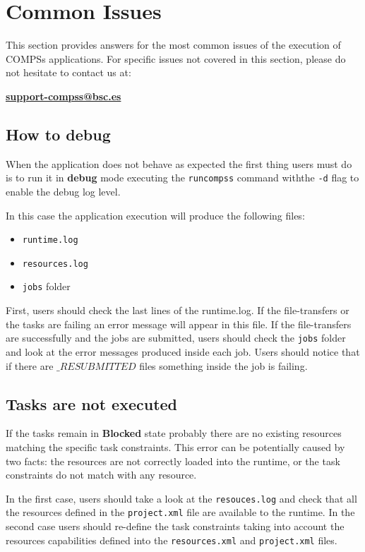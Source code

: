 \section{Common Issues}
\label{sec:Common_Issues}

This section provides answers for the most common issues of the execution of COMPSs applications.
For specific issues not covered in this section, please do not hesitate to contact us at:
\begin{center}
  \textbf{\url{support-compss@bsc.es}}
\end{center}

\subsection{How to debug}
When the application does not behave as expected the first thing users must do is to run it in \textbf{debug} mode executing the \texttt{runcompss} command withthe \texttt{-d} flag to enable the debug log level.

In this case the application execution will produce the following files:
\begin{itemize}
 \item \texttt{runtime.log}
 \item \texttt{resources.log}
 \item \texttt{jobs} folder
\end{itemize}

First, users should check the last lines of the runtime.log. If the file-transfers or the tasks are failing an error message 
will appear in this file. If the file-transfers are successfully and the jobs are submitted, users should check the \texttt{jobs} folder and look 
at the error messages produced inside each job. Users should notice that if there are $\_RESUBMITTED$ files something 
inside the job is failing.

\subsection{Tasks are not executed}
If the tasks remain in \textbf{Blocked} state probably there are no existing resources matching the specific task constraints. 
This error can be potentially caused by two facts: the resources are not correctly loaded into the runtime, or the task constraints do not match with any resource. 

In the first case, users should take a look at the \texttt{resouces.log} and check that all the resources
defined in the \texttt{project.xml} file are available to the runtime. In the second case users should re-define the task 
constraints taking into account the resources capabilities defined into the \texttt{resources.xml} and \texttt{project.xml} files.

